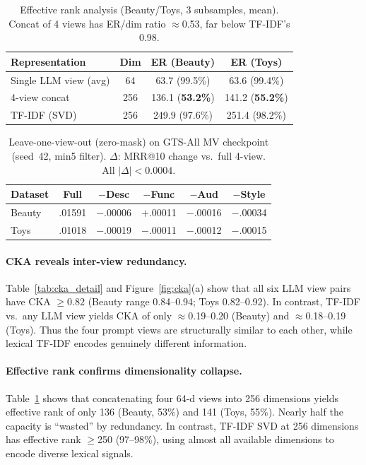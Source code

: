 \documentclass[sigconf,natbib=true,anonymous]{acmart}
\newcommand{\tfidf}{\textsc{TF-IDF}\xspace}
\begin{document}
\begin{table}[t]
\centering
\caption{%
Effective rank analysis (Beauty/Toys, 3 subsamples, mean).
Concat of 4 views has ER/dim ratio $\approx$0.53, far below TF-IDF's 0.98.%
}
\label{tab:effrank}
\small
\begin{tabular}{@{}lccc@{}}
\toprule
Representation & Dim & ER (Beauty) & ER (Toys) \\
\midrule
Single LLM view (avg) & 64 & 63.7 (99.5\%) & 63.6 (99.4\%) \\
4-view concat & 256 & 136.1 (\textbf{53.2\%}) & 141.2 (\textbf{55.2\%}) \\
TF-IDF (SVD) & 256 & 249.9 (97.6\%) & 251.4 (98.2\%) \\
\bottomrule
\end{tabular}
\end{table}

\begin{table}[t]
\centering
\caption{%
Leave-one-view-out (zero-mask) on GTS-All MV checkpoint (seed~42, min5 filter).
$\Delta$: MRR@10 change vs.\ full 4-view.  All $|\Delta|<0.0004$.%
}
\label{tab:loov}
\small
\setlength{\tabcolsep}{3.5pt}
\begin{tabular}{@{}lccccc@{}}
\toprule
Dataset & Full & $-$Desc & $-$Func & $-$Aud & $-$Style \\
\midrule
Beauty & .01591 & $-$.00006 & $+$.00011 & $-$.00016 & $-$.00034 \\
Toys   & .01018 & $-$.00019 & $-$.00011 & $-$.00012 & $-$.00015 \\
\bottomrule
\end{tabular}
\end{table}

\paragraph{CKA reveals inter-view redundancy.}
Table~\ref{tab:cka_detail} and Figure~\ref{fig:cka}(a) show that all six LLM view pairs have CKA $\ge 0.82$ (Beauty range 0.84--0.94; Toys 0.82--0.92).
In contrast, \tfidf vs.\ any LLM view yields CKA of only $\approx$0.19--0.20 (Beauty) and $\approx$0.18--0.19 (Toys).
Thus the four prompt views are structurally similar to each other, while lexical \tfidf encodes genuinely different information.

\paragraph{Effective rank confirms dimensionality collapse.}
Table~\ref{tab:effrank} shows that concatenating four 64-d views into 256 dimensions yields effective rank of only 136 (Beauty, 53\%) and 141 (Toys, 55\%).
Nearly half the capacity is ``wasted'' by redundancy.
In contrast, TF-IDF SVD at 256 dimensions has effective rank $\ge$250 (97--98\%), using almost all available dimensions to encode diverse lexical signals.
\end{document}
